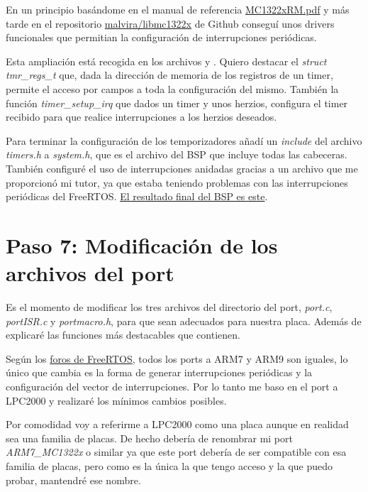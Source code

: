 En un principio basándome en el manual de referencia \href{https://www.nxp.com/docs/en/reference-manual/MC1322xRM.pdf}{MC1322xRM.pdf} y más tarde en el repositorio \href{https://github.com/malvira/libmc1322x}{malvira/libmc1322x} de Github conseguí unos drivers funcionales que permitian la configuración de interrupciones periódicas.

Esta ampliación está recogida en los archivos  y . Quiero destacar el \emph{struct tmr\_regs\_t} que, dada la dirección de memoria de los registros de un timer, permite el acceso por campos a toda la configuración del mismo. También la función \emph{timer\_setup\_irq} que dados un timer y unos herzios, configura el timer recibido para que realice interrupciones a los herzios deseados.

Para terminar la configuración de los temporizadores añadí un \emph{include} del archivo \emph{timers.h} a \emph{system.h}, que es el archivo del BSP que incluye todas las cabeceras.\\

También configuré el uso de interrupciones anidadas gracias a un archivo que me proporcionó mi tutor, ya que estaba teniendo problemas con las interrupciones periódicas del FreeRTOS.
\href{https://github.com/epaubert/FreeRTOS-Kernel-TFG/tree/main/portable/GCC/ARM7_MC13224V/bsp}{El resultado final del BSP es este}.

\section{Paso 7: Modificación de los archivos del port}
Es el momento de modificar los tres archivos del directorio del port, \emph{port.c}, \emph{portISR.c} y \emph{portmacro.h}, para que sean adecuados para nuestra placa. Además de explicaré las funciones más destacables que contienen.

Según los \href{https://forums.freertos.org/t/new-port-attempted-is-hanging-rowley-xstudio/3337/2}{foros de FreeRTOS}, todos los ports a ARM7 y ARM9 son iguales, lo único que cambia es la forma de generar interrupciones periódicas y la configuración del vector de interrupciones. Por lo tanto me baso en el port a LPC2000 y realizaré los mínimos cambios posibles.

Por comodidad voy a referirme a LPC2000 como una placa aunque en realidad sea una familia de placas. De hecho debería de renombrar mi port \emph{ARM7\_MC1322x} o similar ya que este port debería de ser compatible con esa familia de placas, pero como es la única la que tengo acceso y la que puedo probar, mantendré ese nombre.\\


